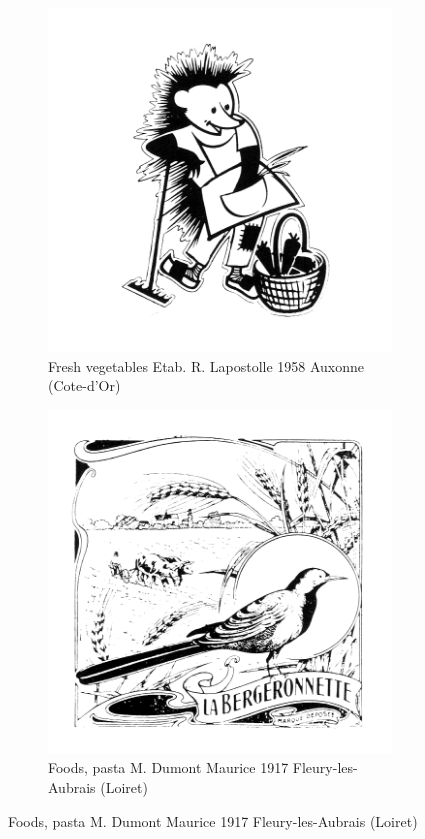 \begin{figure}[h]
  \begin{subfigure}{.45\textwidth}
    \centering
    \includegraphics[width=.5\linewidth]{images/supplement/trademarks/french/11_6}
    \caption{Fresh vegetables Etab. R. Lapostolle 1958 Auxonne (Cote-d'Or)}
    \label{fig:trademarks:french:11.6}
  \end{subfigure}\hfill
  \begin{subfigure}{.45\textwidth}
    \centering
    \includegraphics[width=.5\linewidth]{images/supplement/trademarks/french/12_1}
    \caption{Foods, pasta M. Dumont Maurice 1917 Fleury-les-Aubrais (Loiret)}
    \label{fig:trademarks:french:12.1}
  \end{subfigure}


\end{figure}

